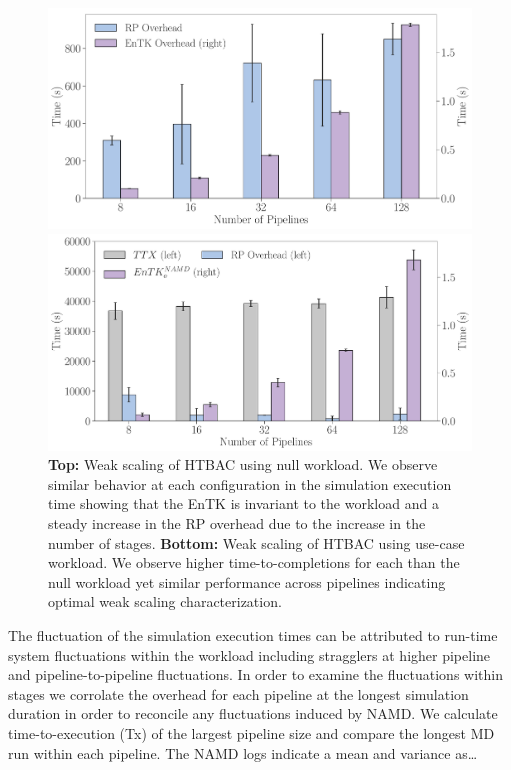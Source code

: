 \begin{figure}[!htbp]
  \centering
  \begin{minipage}[b]{0.49\textwidth}
  \centering
  \includegraphics[width=\textwidth]{FIGURES/null_workload_overheads.pdf}
  \end{minipage}
  \begin{minipage}[b]{0.49\textwidth}
  \centering
  \includegraphics[width=\textwidth]{FIGURES/namd_workload_overheads.pdf}
  \end{minipage}
  \caption{\textbf{Top:} Weak scaling of HTBAC using null workload. We
          observe similar behavior at each configuration in the simulation
          execution time showing that the EnTK is invariant to the
          workload and a steady increase in the RP overhead due to the
          increase in the number of stages. \textbf{Bottom:} Weak scaling of
          HTBAC using use-case workload. We observe higher time-to-completions for each  than the null workload yet similar performance across pipelines indicating optimal weak scaling characterization.}\label{fig:htbac_perf}
\end{figure}


The fluctuation of the simulation execution times can be attributed to
run-time system fluctuations within the workload including stragglers at
higher pipeline and pipeline-to-pipeline fluctuations. In order to examine
the fluctuations within stages we corrolate the overhead for each pipeline at
the longest simulation duration in order to reconcile any fluctuations
induced by NAMD\@. We calculate time-to-execution (Tx) of the largest
pipeline size and compare the longest MD run within each pipeline. The NAMD
logs indicate a mean and variance as\ldots

